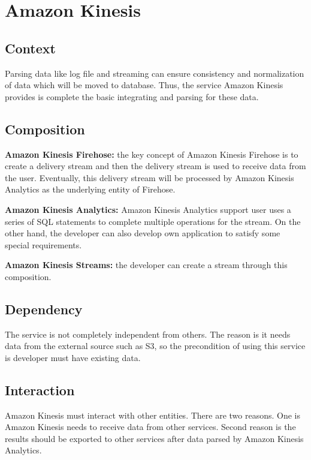  \section{Amazon Kinesis}
	\subsection{Context}
    Parsing data like log file and streaming can ensure consistency and normalization of data which will be moved to database. Thus, the service Amazon Kinesis provides is complete the basic integrating and parsing for these data.
        
	\subsection{Composition}

    \textbf{Amazon Kinesis Firehose:} the key concept of Amazon Kinesis Firehose is to create a delivery stream and then the delivery stream is used to receive data from the user. Eventually, this delivery stream will be processed by Amazon Kinesis Analytics as the underlying entity of Firehose.\cite{z3}
    
    \noindent \textbf{Amazon Kinesis Analytics:} Amazon Kinesis Analytics support user uses a series of SQL statements to complete multiple operations for the stream. On the other hand, the developer can also develop own application to satisfy some special requirements.
     
    \noindent \textbf{Amazon Kinesis Streams:} the developer can create a stream through this composition.

	\subsection{Dependency}

    The service is not completely independent from others. The reason is it needs data from the external source such as S3, so the precondition of using this service is developer must have existing data.
    
	\subsection{Interaction}
    Amazon Kinesis must interact with other entities. There are two reasons. One is Amazon Kinesis needs to receive data from other services. Second reason is the results should be exported to other services after data parsed by Amazon Kinesis Analytics. 

